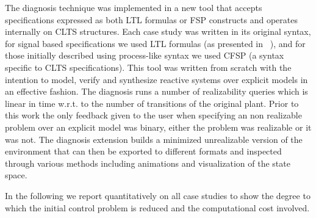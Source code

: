 \vspace{-1em}
The diagnosis technique was implemented in a new tool that accepts specifications expressed as both LTL formulas or FSP constructs and operates internally on CLTS structures. Each case study was written in its original syntax, for signal based specifications we used LTL formulas (as presented in ~\cite{Bloem:2012}), and for those initially described using process-like syntax we used CFSP (a syntax specific to CLTS specifications). This tool was written from scratch with the intention to model, verify and synthesize reactive systems over explicit models in an effective fashion. 
The diagnosis runs a number of realizability queries which is linear in time w.r.t. to the number of transitions of the original plant.
Prior to this work the only feedback given to the user  when specifying an non realizable problem over an explicit model was binary, either the problem was realizable or it was not.
The diagnosis extension builds a minimized unrealizable version of the environment that can then be exported to different formats and inspected through various methods including animations and visualization of the state space.

In the following we report quantitatively on all case studies to show the degree to which the initial control problem is reduced and the computational cost involved. 

